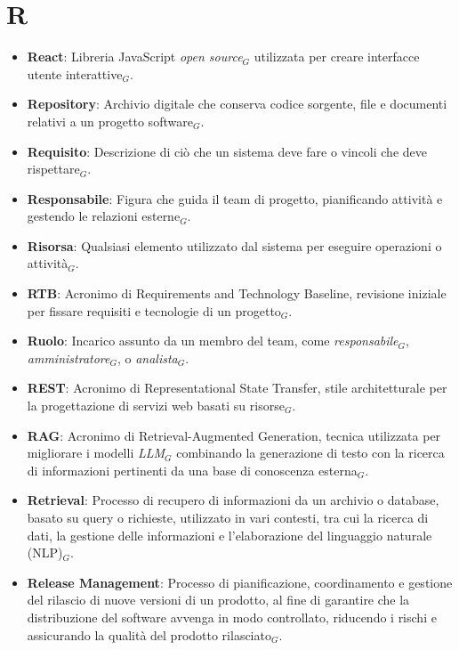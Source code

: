 \section{R}
\begin{itemize}
    \item \textbf{React}: Libreria JavaScript \textit{open source}$_G$ utilizzata per creare interfacce utente interattive$_G$.
    \item \textbf{Repository}: Archivio digitale che conserva codice sorgente, file e documenti relativi a un progetto software$_G$.
    \item \textbf{Requisito}: Descrizione di ciò che un sistema deve fare o vincoli che deve rispettare$_G$.
    \item \textbf{Responsabile}: Figura che guida il team di progetto, pianificando attività e gestendo le relazioni esterne$_G$.
    \item \textbf{Risorsa}: Qualsiasi elemento utilizzato dal sistema per eseguire operazioni o attività$_G$.
    \item \textbf{RTB}: Acronimo di Requirements and Technology Baseline, revisione iniziale per fissare requisiti e tecnologie di un progetto$_G$.
    \item \textbf{Ruolo}: Incarico assunto da un membro del team, come \textit{responsabile}$_G$, \textit{amministratore}$_G$, o \textit{analista}$_G$.
    \item \textbf{REST}: Acronimo di Representational State Transfer, stile architetturale per la progettazione di servizi web basati su risorse$_G$.
    \item \textbf{RAG}: Acronimo di Retrieval-Augmented Generation, tecnica utilizzata per migliorare i modelli \textit{LLM}$_G$ combinando la generazione di testo con la ricerca di informazioni pertinenti da una base di conoscenza esterna$_G$.
    \item \textbf{Retrieval}: Processo di recupero di informazioni da un archivio o database, basato su query o richieste, utilizzato in vari contesti, tra cui la ricerca di dati, la gestione delle informazioni e l'elaborazione del linguaggio naturale (NLP)$_G$.
    \item \textbf{Release Management}: Processo di pianificazione, coordinamento e gestione del rilascio di nuove versioni di un prodotto, al fine di garantire che la distribuzione del software avvenga in modo controllato, riducendo i rischi e assicurando la qualità del prodotto rilasciato$_G$.
\end{itemize}
